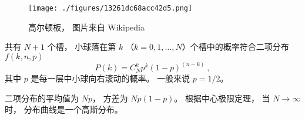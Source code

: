 
\begin{issues}
\issueDraft
\end{issues}


\begin{figure}[ht]
\centering
\texttt{[image: ./figures/13261dc68acc42d5.png]}
\caption{高尔顿板， 图片来自 Wikipedia} \label{fig_Galton_1}
\end{figure}

共有 $N+1$ 个槽， 小球落在第 $k$ （$k = 0,1,\dots,N$）个槽中的概率符合二项分布 $f(k,n,p)$
\begin{equation}
P(k) = C_N^k p^k (1-p)^{(n-k)}~,
\end{equation}
其中 $p$ 是每一层中小球向右滚动的概率。 一般来说 $p = 1/2$。

二项分布的平均值为 $Np$， 方差为 $Np(1-p)$。 根据中心极限定理， 当 $N\to\infty$ 时， 分布曲线是一个高斯分布。
